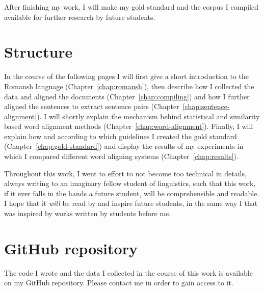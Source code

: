 After finishing my work, I will make my gold standard and the corpus I compiled available for further research by future students.

\section{Structure}
In the course of the following pages I will first give a short introduction to the Romansh language (Chapter~\ref{chap:romansh}), then describe how I collected the data and aligned the documents (Chapter~\ref{chap:compiling}) and how I further aligned the sentences to extract sentence pairs (Chapter~\ref{chap:sentence-alignment}). 
I will shortly explain the mechanism behind statistical and similarity based word alignment methods (Chapter~\ref{chap:word-alignment}). 
Finally, I will explain how and according to which guidelines I created the gold standard (Chapter~\ref{chap:gold-standard}) and display the results of my experiments in which I compared different word aligning systems (Chapter~\ref{chap:results}).

Throughout this work, I went to effort to not become too technical in details, always writing to an imaginary fellow  student of linguistics, such that this work, if it ever falls in the hands a future student, will be comprehensible and readable. 
I hope that it \emph{will} be read by and inspire future students, in the same way I that was inspired by works written by students before me.

\section{GitHub repository}
The code I wrote and the data I collected in the course of this work is available on my GitHub repository. 
Please contact me in order to gain access to it.


